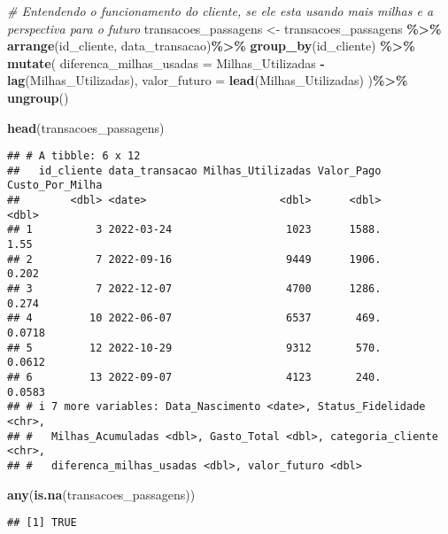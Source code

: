\documentclass[
]{article}
\newenvironment{Shaded}{\begin{snugshade}}{\end{snugshade}}
\newcommand{\AttributeTok}[1]{\textcolor[rgb]{0.13,0.29,0.53}{#1}}
\newcommand{\CommentTok}[1]{\textcolor[rgb]{0.56,0.35,0.01}{\textit{#1}}}
\newcommand{\FunctionTok}[1]{\textcolor[rgb]{0.13,0.29,0.53}{\textbf{#1}}}
\newcommand{\NormalTok}[1]{#1}
\newcommand{\OtherTok}[1]{\textcolor[rgb]{0.56,0.35,0.01}{#1}}
\newcommand{\SpecialCharTok}[1]{\textcolor[rgb]{0.81,0.36,0.00}{\textbf{#1}}}
\begin{document}
\begin{Shaded}
\begin{Highlighting}[]
\CommentTok{\# Entendendo o funcionamento do cliente, se ele esta usando mais milhas e a perspectiva para o futuro}
\NormalTok{transacoes\_passagens }\OtherTok{\textless{}{-}}\NormalTok{ transacoes\_passagens }\SpecialCharTok{\%\textgreater{}\%} 
  \FunctionTok{arrange}\NormalTok{(id\_cliente, data\_transacao)}\SpecialCharTok{\%\textgreater{}\%}
  \FunctionTok{group\_by}\NormalTok{(id\_cliente) }\SpecialCharTok{\%\textgreater{}\%}
  \FunctionTok{mutate}\NormalTok{(}
    \AttributeTok{diferenca\_milhas\_usadas =}\NormalTok{ Milhas\_Utilizadas }\SpecialCharTok{{-}} \FunctionTok{lag}\NormalTok{(Milhas\_Utilizadas),}
    \AttributeTok{valor\_futuro =} \FunctionTok{lead}\NormalTok{(Milhas\_Utilizadas)}
\NormalTok{  )}\SpecialCharTok{\%\textgreater{}\%}
  \FunctionTok{ungroup}\NormalTok{()}

\FunctionTok{head}\NormalTok{(transacoes\_passagens)}
\end{Highlighting}
\end{Shaded}

\begin{verbatim}
## # A tibble: 6 x 12
##   id_cliente data_transacao Milhas_Utilizadas Valor_Pago Custo_Por_Milha
##        <dbl> <date>                     <dbl>      <dbl>           <dbl>
## 1          3 2022-03-24                  1023      1588.          1.55  
## 2          7 2022-09-16                  9449      1906.          0.202 
## 3          7 2022-12-07                  4700      1286.          0.274 
## 4         10 2022-06-07                  6537       469.          0.0718
## 5         12 2022-10-29                  9312       570.          0.0612
## 6         13 2022-09-07                  4123       240.          0.0583
## # i 7 more variables: Data_Nascimento <date>, Status_Fidelidade <chr>,
## #   Milhas_Acumuladas <dbl>, Gasto_Total <dbl>, categoria_cliente <chr>,
## #   diferenca_milhas_usadas <dbl>, valor_futuro <dbl>
\end{verbatim}

\begin{Shaded}
\begin{Highlighting}[]
\FunctionTok{any}\NormalTok{(}\FunctionTok{is.na}\NormalTok{(transacoes\_passagens))}
\end{Highlighting}
\end{Shaded}

\begin{verbatim}
## [1] TRUE
\end{verbatim}
\end{document}
